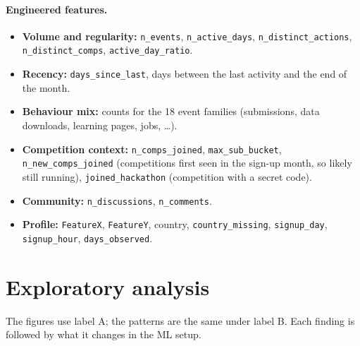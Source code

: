 \documentclass[11pt,a4paper]{article}
\newcommand{\code}[1]{\texttt{#1}}
\begin{document}
\paragraph{Engineered features.}
\begingroup\raggedright%
\begin{itemize}
  \item \textbf{Volume and regularity:} \code{n\_events}, \code{n\_active\_days}, \code{n\_distinct\_actions}, \code{n\_distinct\_comps}, \code{active\_day\_ratio}.
  \item \textbf{Recency:} \code{days\_since\_last}, days between the last activity and the end of the month.
  \item \textbf{Behaviour mix:} counts for the 18 event families (submissions, data downloads, learning pages, jobs, \dots).
  \item \textbf{Competition context:} \code{n\_comps\_joined}, \code{max\_sub\_bucket}, \code{n\_new\_comps\_joined} (competitions first seen in the sign-up month, so likely still running), \code{joined\_hackathon} (competition with a secret code).
  \item \textbf{Community:} \code{n\_discussions}, \code{n\_comments}.
  \item \textbf{Profile:} \code{FeatureX}, \code{FeatureY}, country, \code{country\_missing}, \code{signup\_day}, \code{signup\_hour}, \code{days\_observed}.
\end{itemize}
\endgroup

\section{Exploratory analysis}\label{sec:eda}
The figures use label A\@; the patterns are the same under label B\@. Each finding is followed by what it changes in the ML setup.
\end{document}
